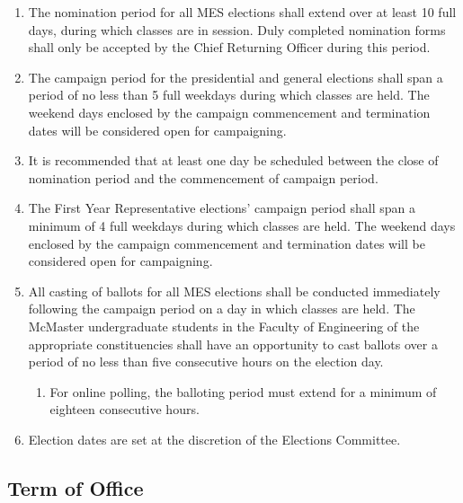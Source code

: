 \begin{enumerate}
 \item
  The nomination period for all MES elections shall extend over at least
  10 full days, during which classes are in session. Duly completed
  nomination forms shall only be accepted by the Chief Returning Officer
  during this period.
 \item
  The campaign period for the presidential and general elections shall
  span a period of no less than 5 full weekdays during which classes are
  held. The weekend days enclosed by the campaign commencement and
  termination dates will be considered open for campaigning.
 \item
  It is recommended that at least one day be scheduled between the close
  of nomination period and the commencement of campaign period.
 \item
  The First Year Representative elections' campaign period shall span a
  minimum of 4 full weekdays during which classes are held. The weekend
  days enclosed by the campaign commencement and termination dates will
  be considered open for campaigning.
 \item
  All casting of ballots for all MES elections shall be conducted
  immediately following the campaign period on a day in which classes
  are held. The McMaster undergraduate students in the Faculty of
  Engineering of the appropriate constituencies shall have an
  opportunity to cast ballots over a period of no less than five
  consecutive hours on the election day.

  \begin{enumerate}
   \item
    For online polling, the balloting period must extend for a minimum
    of eighteen consecutive hours.
  \end{enumerate}
 \item
  Election dates are set at the discretion of the Elections Committee.

\end{enumerate}
\hypertarget{term-of-office}{%
 \subsection{Term of Office}
 \label{term-of-office}}
